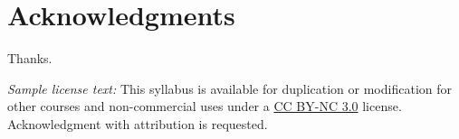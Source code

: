 \section{Acknowledgments}

Thanks.

\emph{Sample license text:} This syllabus is available for duplication
or modification for other courses and non-commercial uses under a
\href{http://creativecommons.org/licenses/by-nc/3.0/}{CC BY-NC 3.0}
license. Acknowledgment with attribution is requested.
